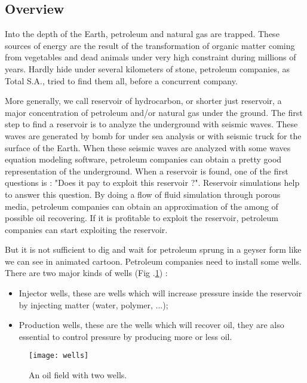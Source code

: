 \subsection{Overview}

%
Into the depth of the Earth, petroleum and natural gas are trapped.
%
These sources of energy are the result of the transformation of organic matter coming from vegetables and dead animals under very high constraint during millions of years.
%
Hardly hide under several kilometers of stone, petroleum companies, as Total S.A., tried to find them all, before a concurrent company.



More generally, we call reservoir of hydrocarbon, or shorter just reservoir, a major concentration of petroleum and/or natural gas under the ground.
%
The first step to find a reservoir is to analyze the underground with seismic waves.
%
These waves are generated by bomb for under sea analysis or with seismic truck for the surface of the Earth.
%
When these seismic waves are analyzed with some waves equation modeling software, petroleum companies can obtain a pretty good representation of the underground.
%
When a reservoir is found, one of the first questions is : "Does it pay to exploit this reservoir ?".
%
Reservoir simulations help to answer this question.
%
By doing a flow of fluid simulation through porous media, petroleum companies can obtain an approximation of the among of possible oil recovering.
%
If it is profitable to exploit the reservoir, petroleum companies can start exploiting the reservoir.



But it is not sufficient to dig and wait for petroleum sprung in a geyser form like we can see in animated cartoon.
%
Petroleum companies need to install some wells.
%
There are two major kinds of wells (Fig .\ref{fig:wells}) :
%
\begin{itemize}
  \item Injector wells, these are wells which will increase pressure inside the reservoir by injecting matter (water, polymer, ...);
  \item Production wells, these are the wells which will recover oil, they are also essential to control pressure by producing more or less oil.
\end{itemize}

\begin{figure}[!ht]
  \centering
  \texttt{[image: wells]}
  \caption{An oil field with two wells.}
\label{fig:wells}
\end{figure}


